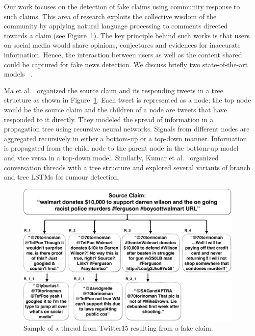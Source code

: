 \documentclass[letterpaper]{article} %
\begin{document}
Our work focuses on the detection of fake claims using community response to such claims. This area of research exploits the collective wisdom of the community by applying natural language processing to comments directed towards a claim (see Figure~\ref{fig:proptree}). The key principle behind such works is that users on social media would share opinions, conjectures and evidences for inaccurate information. Hence, the interaction between users as well as the content shared could be captured for fake news detection. We discuss briefly two state-of-the-art models ~\citep{ma18,kumar19}.

Ma et al.~ organized the source claim and its responding tweets in a tree structure as shown in Figure~\ref{fig:proptree}. Each tweet is represented as a node; the top node would be the source claim and the children of a node are tweets that have responded to it directly. They modeled the spread of information in a propagation tree using recursive neural networks. Signals from different nodes are aggregated recursively in either a bottom-up or a top-down manner. Information is propagated from the child node to the parent node in the bottom-up model and vice versa in a top-down model.
Similarly, Kumar et al.~ organized conversation threads with a tree structure and explored several variants of branch and tree LSTMs for rumour detection. 

\begin{figure}[t]
\centering
    \includegraphics[width= 0.98\columnwidth]{prop_tree.pdf}
\caption{Sample of a thread from Twitter15 resulting from a fake claim.}
\label{fig:proptree}
\end{figure}
\end{document}

